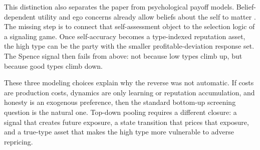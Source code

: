 This distinction also separates the paper from psychological payoff models. Belief-dependent utility and ego concerns already allow beliefs about the self to matter \citep{benabou2002self,koszegi2006ego,battigalli2009dynamic}. The missing step is to connect that self-assessment object to the selection logic of a signaling game. Once self-accuracy becomes a type-indexed reputation asset, the high type can be the party with the smaller profitable-deviation response set. The Spence signal then fails from above: not because low types climb up, but because good types climb down.

These three modeling choices explain why the reverse was not automatic. If costs are production costs, dynamics are only learning or reputation accumulation, and honesty is an exogenous preference, then the standard bottom-up screening question is the natural one. Top-down pooling requires a different closure: a signal that creates future exposure, a state transition that prices that exposure, and a true-type asset that makes the high type more vulnerable to adverse repricing.
